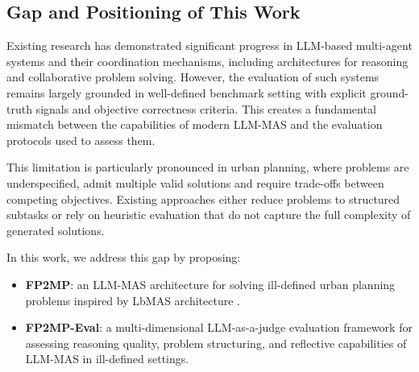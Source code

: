 \subsection{Gap and Positioning of This Work}

Existing research has demonstrated significant progress in LLM-based multi-agent systems and their coordination mechanisms, including architectures for reasoning and collaborative problem solving.
However, the evaluation of such systems remains largely grounded in well-defined benchmark setting with explicit ground-truth signals and objective correctness criteria.
This creates a fundamental mismatch between the capabilities of modern LLM-MAS and the evaluation protocols used to assess them.

This limitation is particularly pronounced in urban planning, where problems are underspecified, admit multiple valid solutions and require trade-offs between competing objectives. 
Existing approaches either reduce problems to structured subtasks or rely on heuristic evaluation that do not capture the full complexity of generated solutions.

In this work, we address this gap by proposing:

\begin{itemize}
    \item \textbf{FP2MP}: an LLM-MAS architecture for solving ill-defined urban planning problems inspired by LbMAS architecture \cite{han2025exploring}.
    \item \textbf{FP2MP-Eval}: a multi-dimensional LLM-as-a-judge evaluation framework for assessing reasoning quality, problem structuring, and reflective capabilities of LLM-MAS in ill-defined settings.
\end{itemize}
